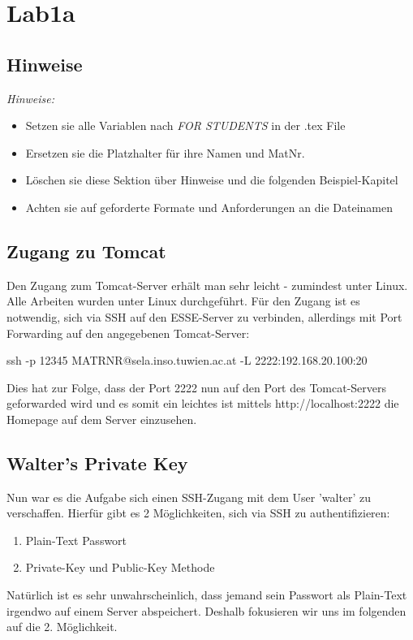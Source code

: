 \section{Lab1a}

\subsection{Hinweise}
\emph{Hinweise:}
\begin{itemize}
    \item Setzen sie alle Variablen nach \emph{FOR STUDENTS} in der .tex File
    \item Ersetzen sie die Platzhalter für ihre Namen und MatNr.
    \item Löschen sie diese Sektion über Hinweise und die folgenden Beispiel-Kapitel
    \item Achten sie auf geforderte Formate und Anforderungen an die Dateinamen
\end{itemize}

\subsection{Zugang zu Tomcat}
Den Zugang zum Tomcat-Server erhält man sehr leicht - zumindest unter Linux. Alle Arbeiten wurden unter Linux
durchgeführt. Für den Zugang ist es notwendig, sich via SSH auf den ESSE-Server zu verbinden, allerdings mit Port Forwarding
auf den angegebenen Tomcat-Server:

ssh -p 12345 MATRNR@sela.inso.tuwien.ac.at -L 2222:192.168.20.100:20

Dies hat zur Folge, dass der Port 2222 nun auf den Port des Tomcat-Servers geforwarded wird und es somit ein leichtes
ist mittels http://localhost:2222 die Homepage auf dem Server einzusehen.

\subsection{Walter's Private Key}
Nun war es die Aufgabe sich einen SSH-Zugang mit dem User 'walter' zu verschaffen. Hierfür gibt es 2 Möglichkeiten, sich
via SSH zu authentifizieren:
\begin{enumerate}
\item Plain-Text Passwort
\item Private-Key und Public-Key Methode
\end{enumerate}

Natürlich ist es sehr unwahrscheinlich, dass jemand sein Passwort als Plain-Text irgendwo auf einem Server abspeichert. Deshalb
fokusieren wir uns im folgenden auf die 2. Möglichkeit.

